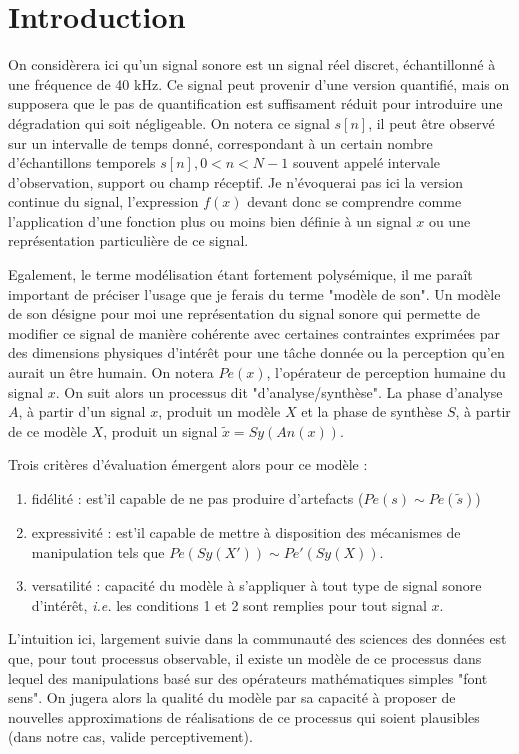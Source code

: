 \section{Introduction}

On considèrera ici qu'un signal sonore est un signal réel discret, échantillonné à une fréquence de 40 kHz. Ce signal peut provenir d'une version quantifié, mais on supposera que le pas de quantification est suffisament réduit pour introduire une dégradation qui soit négligeable. On notera ce signal $s[n]$, il peut être observé sur un intervalle de temps donné, correspondant à un certain nombre d'échantillons temporels $s[n], 0<n<N-1$ souvent appelé intervale d'observation, support ou champ réceptif. Je n'évoquerai pas ici la version continue du signal, l'expression $f(x)$ devant donc se comprendre comme l'application d'une fonction plus ou moins bien définie à un signal $x$ ou une représentation particulière de ce signal.

Egalement, le terme modélisation étant fortement polysémique, il me paraît important de préciser l'usage que je ferais du terme "modèle de son". Un modèle de son désigne pour moi une représentation du signal sonore qui permette de modifier ce signal de manière cohérente avec certaines contraintes exprimées par des dimensions physiques d'intérêt pour une tâche donnée ou la perception qu'en aurait un être humain. On notera $Pe(x)$, l'opérateur de perception humaine du signal $x$. On suit alors un processus dit "d'analyse/synthèse". La phase d'analyse $A$, à partir d'un signal $x$, produit un modèle $X$ et la phase de synthèse $S$, à partir de ce modèle $X$, produit un signal $\tilde{x}=Sy(An(x))$.

Trois critères d'évaluation émergent alors pour ce modèle :
\begin{enumerate}
  \item fidélité : est'il capable de ne pas produire d'artefacts ($Pe(s) \sim Pe(\tilde{s})$)
  \item expressivité : est'il capable de mettre à disposition des mécanismes de manipulation tels que $Pe(Sy(X')) \sim Pe'(Sy(X))$.
  \item versatilité : capacité du modèle à s'appliquer à tout type de signal sonore d'intérêt, \textit{i.e.} les conditions 1 et 2 sont remplies pour tout signal $x$.
\end{enumerate}

L'intuition ici, largement suivie dans la communauté des sciences des données est que, pour tout processus observable, il existe un modèle de ce processus dans lequel des manipulations basé sur des opérateurs mathématiques simples "font sens". On jugera alors la qualité du modèle par sa capacité à proposer de nouvelles approximations de réalisations de ce processus qui soient plausibles (dans notre cas, valide perceptivement).

